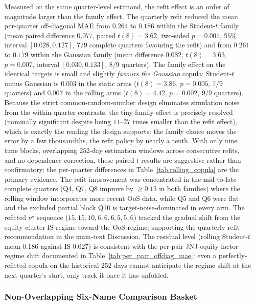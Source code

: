 Measured on the same quarter-level estimand, the refit effect is an order of magnitude larger than the family effect. The quarterly refit reduced the mean per-quarter off-diagonal MAE from $0.264$ to $0.186$ within the Student-$t$ family (mean paired difference $0.077$, paired $t(8) = 3.62$, two-sided $p = 0.007$, $95\%$ interval $[0.028, 0.127]$, $7/9$ complete quarters favouring the refit) and from $0.261$ to $0.179$ within the Gaussian family (mean difference $0.082$, $t(8) = 3.63$, $p = 0.007$, interval $[0.030, 0.133]$, $8/9$ quarters). The family effect on the identical targets is small and slightly \emph{favours the Gaussian} copula: Student-$t$ minus Gaussian is $0.003$ in the static arms ($t(8) = 3.86$, $p = 0.005$, $7/9$ quarters) and $0.007$ in the rolling arms ($t(8) = 4.42$, $p = 0.002$, $9/9$ quarters). Because the strict common-random-number design eliminates simulation noise from the within-quarter contrasts, the tiny family effect is precisely resolved (nominally significant despite being $11$--$27$ times smaller than the refit effect), which is exactly the reading the design supports: the family choice moves the error by a few thousandths, the refit policy by nearly a tenth. With only nine time blocks, overlapping $252$-day estimation windows across consecutive refits, and no dependence correction, these paired-$t$ results are suggestive rather than confirmatory; the per-quarter differences in Table~\ref{tab:rolling_copula} are the primary evidence. The refit improvement was concentrated in the mid-to-late complete quarters (Q4, Q7, Q8 improve by $\ge 0.13$ in both families) where the rolling window incorporates more recent OoS data, while Q5 and Q6 were flat and the excluded partial block Q10 is target-noise-dominated in every arm. The refitted $\nu^\star$ sequence ($15, 15, 10, 6, 6, 6, 5, 5, 6$) tracked the gradual shift from the equity-cluster IS regime toward the OoS regime, supporting the quarterly-refit recommendation in the main-text Discussion. The residual level (rolling Student-$t$ mean $0.186$ against IS $0.027$) is consistent with the per-pair JNJ-equity-factor regime shift documented in Table~\ref{tab:per_pair_offdiag_mae}: even a perfectly-refitted copula on the historical $252$ days cannot anticipate the regime shift at the next quarter's start, only track it once it has unfolded.

\subsubsection{Non-Overlapping Six-Name Comparison Basket}
\label{sec:nonoverlap_basket}

